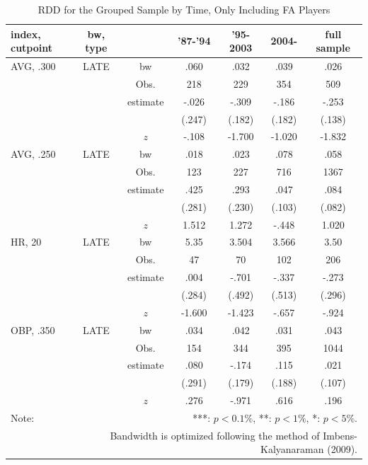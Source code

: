\documentclass[dvipdfmx, 12pt]{article}
\begin{document}
\begin{table}[H]
  \centering
  \caption{RDD for the Grouped Sample by Time, Only Including FA Players}
  \label{RDD_Era_FA}
  \footnotesize
  \begin{tabular}{lcccccc} \hline
    index, cutpoint & bw, type &  &'87-'94 & '95-2003 & 2004- &full sample \\ \hline \hline
    AVG, .300 & LATE & bw & .060 & .032 & .039 & .026 \\
    &  & Obs. & 218 & 229 & 354 & 509 \\
    &  & estimate & -.026 & -.309 & -.186 & -.253 \\
    &  & & (.247) & (.182) & (.182) & (.138) \\
    & & $z$ & -.108 & -1.700 &  -1.020 & -1.832 \\ \hline
    AVG, .250 & LATE & bw & .018 & .023 & .078 & .058 \\
    &  & Obs. & 123 & 227 & 716 & 1367 \\
    &  & estimate & .425 & .293 & .047 & .084 \\
    &  & & (.281) & (.230) & (.103) & (.082) \\
    & & $z$ & 1.512 & 1.272 & -.448 & 1.020 \\ \hline
    HR, 20 & LATE & bw & 5.35 & 3.504 & 3.566 & 3.50 \\
    &  & Obs. & 47 & 70 & 102 & 206 \\
    &  & estimate & .004 & -.701 & -.337 & -.273 \\
    &  & & (.284) & (.492) & (.513) & (.296) \\
    & & $z$ & -1.600 & -1.423 & -.657 & -.924 \\ \hline
    OBP, .350 & LATE & bw & .034 & .042 & .031 & .043 \\
    &  & Obs. & 154 & 344 & 395 & 1044 \\
    &  & estimate & .080 & -.174 & .115 & .021 \\
    &  & & (.291) & (.179) & (.188) & (.107) \\
    & & $z$ & .276 & -.971 & .616 & .196 \\ \hline
    Note: & \multicolumn{6}{r}{***: $p<0.1\%$, **: $p<1\%$, *: $p<5\%$.} \\
    & \multicolumn{6}{r}{Bandwidth is optimized following the method of Imbens-Kalyanaraman (2009).}
  \end{tabular}
\end{table}


\end{document}
